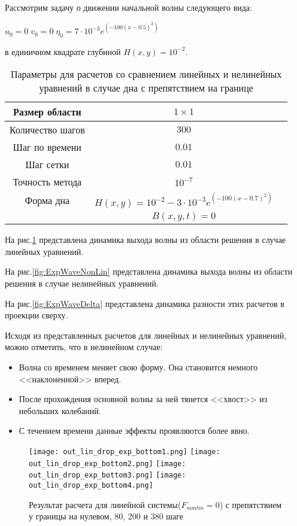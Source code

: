 \newpage
Рассмотрим задачу о движении начальной волны следующего вида:

$u_0=0\;v_0=0\;\eta_0=7 \cdot 10^{-3}e^{(-100 (x-0.5)^2)}$

в единичном квадрате глубиной $H(x,y)=10^{-2}$.

\begin{table}[H]
    \label{tab:FirstResult}
    \caption{Параметры для расчетов со сравнением линейных и нелинейных уравнений в случае дна с препятствием на границе}
    \begin{center}
	\begin{tabular}{|c|c|c|}
	    \hline
	    Размер области & $1\times1$\\
	    \hline
	    Количество шагов & $300$\\
	    \hline
	    Шаг по времени & $0.01$\\
	    \hline
	    Шаг сетки & $0.01$\\
	    \hline
	    Точность метода & $10^{-7}$\\
	    \hline
	    Форма дна & $H(x,y)=10^{-2}-3 \cdot 10^{-3}e^{(-100 (x-0.7)^2)}$\\
	    & $B(x,y,t)=0$\\
	    \hline
	\end{tabular}
    \end{center}
\end{table}

На рис.\ref{fig:ExpWaveLin} представлена динамика выхода волны из области решения в случае линейных уравнений.

На рис.\ref{fig:ExpWaveNonLin} представлена динамика выхода волны из области решения в случае нелинейных уравнений.

На рис.\ref{fig:ExpWaveDelta} представлена динамика разности этих расчетов в проекции сверху.

Исходя из представленных расчетов для линейных и нелинейных уравнений, можно отметить, что в нелинейном случае:
\begin{itemize}
    \item Волна со временем меняет свою форму. Она становится немного <<наклоненной>> вперед.
    \item После прохождения основной волны за ней тянется <<хвост>> из небольших колебаний.
    \item С течением времени данные эффекты проявляются более явно.
\end{itemize}

\newpage
\begin{figure}[htp]
    \centering
    \vspace{12em}
    \texttt{[image: out\_lin\_drop\_exp\_bottom1.png]}
    \texttt{[image: out\_lin\_drop\_exp\_bottom2.png]}
    \texttt{[image: out\_lin\_drop\_exp\_bottom3.png]}
    \texttt{[image: out\_lin\_drop\_exp\_bottom4.png]}
    \caption{Результат расчета для линейной системы($F_{nonlin}=0$) с препятствием у границы на нулевом, 80, 200 и 380 шаге}
    \label{fig:ExpWaveLin}
\end{figure}

